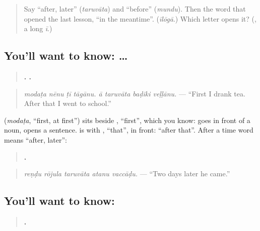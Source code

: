 \label{lesson:TE-C317-a-taruvata}



\begin{quote}
Say \textquotedblleft{}after, later\textquotedblright{} (\emph{taruvāta}) and \textquotedblleft{}before\textquotedblright{} (\emph{mundu}). Then the word that opened the last lesson, \textquotedblleft{}in the meantime\textquotedblright{}. (\emph{īlōgā}.) Which letter opens it? (\textbf{}, a long \emph{ī}.)
\end{quote}

\subsection*{You'll want to know:  …  }
\begin{quote}
\textbf{   .    .}
\end{quote}

\begin{quote}
\emph{modaṭa nēnu ṭī tāgānu. ā taruvāta baḍiki veḷḷānu.} — \textquotedblleft{}First I drank tea. After that I went to school.\textquotedblright{}
\end{quote}

\textbf{} (\emph{modaṭa}, \textquotedblleft{}first, at first\textquotedblright{}) sits beside \textbf{}, \textquotedblleft{}first\textquotedblright{}, which you know: \textbf{} goes in front of a noun, \textbf{} opens a sentence. \textbf{ } is \textbf{} with \textbf{}, \textquotedblleft{}that\textquotedblright{}, in front: \textquotedblleft{}after that\textquotedblright{}. After a time word \textbf{} means \textquotedblleft{}after, later\textquotedblright{}:

\begin{quote}
\textbf{    .}
\end{quote}

\begin{quote}
\emph{reṇḍu rōjula taruvāta atanu vaccāḍu.} — \textquotedblleft{}Two days later he came.\textquotedblright{}
\end{quote}

\subsection*{You'll want to know: }
\begin{quote}
\textbf{     .}
\end{quote}

